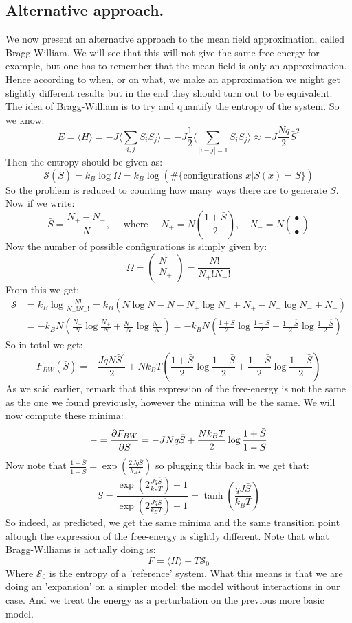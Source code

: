 \documentclass[10pt,a4paper]{book}
\begin{document}
\subsection{Alternative approach.}
We now present an alternative approach to the mean field approximation, called Bragg-William. We will see that this will not give the same free-energy for example, but one has to remember that the mean field is only an approximation. Hence according to when, or on what, we make an approximation we might get slightly different results but in the end they should turn out to be equivalent. The idea of Bragg-William is to try and quantify the entropy of the system. So we know:
\[
E = \langle H \rangle = - J \langle \sum_{i, j} S_i S_j \rangle = - J \frac{1}{2} \langle \sum_{|i - j| = 1} S_i S_j \rangle \approx - J \frac{N q}{2} \bar{S}^2
\]
Then the entropy should be given as:
\[
\mathcal{S}(\bar{S}) = k_B \log \Omega = k_B \log(\#\{\text{configurations } x | \bar{S}(x) = \bar{S}\})
\]
So the problem is reduced to counting how many ways there are to generate $\bar{S}$. Now if we write:
\[
\bar{S} = \frac{N_+ - N_-}{N}, \quad \text{ where } \quad N_+ = N\left(\frac{1 + \bar{S}}{2}\right), \quad N_- = N\left(\frac{•}{•}\right)
\]
Now the number of possible configurations is simply given by:
\[
\Omega = \begin{pmatrix}
N\\N_+
\end{pmatrix}
= \frac{N!}{N_+!N_-!}
\]
From this we get:
\begin{align*}
\mathcal{S} &= k_B \log \frac{N!}{N_+!N_-!} = k_B \left( N\log N - N - N_+\log N_+ + N_+ - N_-\log N_- + N_-  \right)\\
& = -k_B N (\frac{N_+}{N} \log \frac{N_+}{N} + \frac{N_-}{N} \log \frac{N_-}{N})
 = -k_B N \left(\frac{1 + \bar{S}}{2}\log \frac{1 + \bar{S}}{2} + \frac{1 -\bar{S}}{2}\log\frac{1-\bar{S}}{2}\right)
\end{align*}
So in total we get:
\[
F_{BW}(\bar{S}) = -\frac{JqN\bar{S}^2}{2} + Nk_B T\left(\frac{1 + \bar{S}}{2}\log \frac{1 + \bar{S}}{2} + \frac{1 -\bar{S}}{2}\log\frac{1-\bar{S}}{2}\right)
\]
As we said earlier, remark that this expression of the free-energy is not the same as the one we found previously, however the minima will be the same. We will now compute these minima:
\[
- = \pdv{F_{BW}}{\bar{S}} = - J N q \bar{S} + \frac{N k_B T}{2} \log \frac{1 + \bar{S}}{1 - \bar{S}}
\]
Now note that $\frac{1 + \bar{S}}{1 - \bar{S}} = \exp(\frac{2 J q \bar{S}}{k_B T})$ so plugging this back in we get that:
\[
\bar{S} = \frac{\exp(2 \frac{J q \bar{S}}{k_B T}) - 1}{\exp(2\frac{J q \bar{S}}{k_B T}) + 1} = \tanh(\frac{q J \bar{S}}{k_B T})
\]
So indeed, as predicted, we get the same minima and the same transition point altough the expression of the free-energy is slightly different. Note that what Bragg-Williams is actually doing is:
\[
F = \langle H \rangle - T \mathcal{S}_0
\]
Where $\mathcal{S}_0$ is the entropy of a 'reference' system. What this means is that we are doing an 'expansion' on a simpler model: the model without interactions in our case. And we treat the energy as a perturbation on the previous more basic model.
\end{document}
